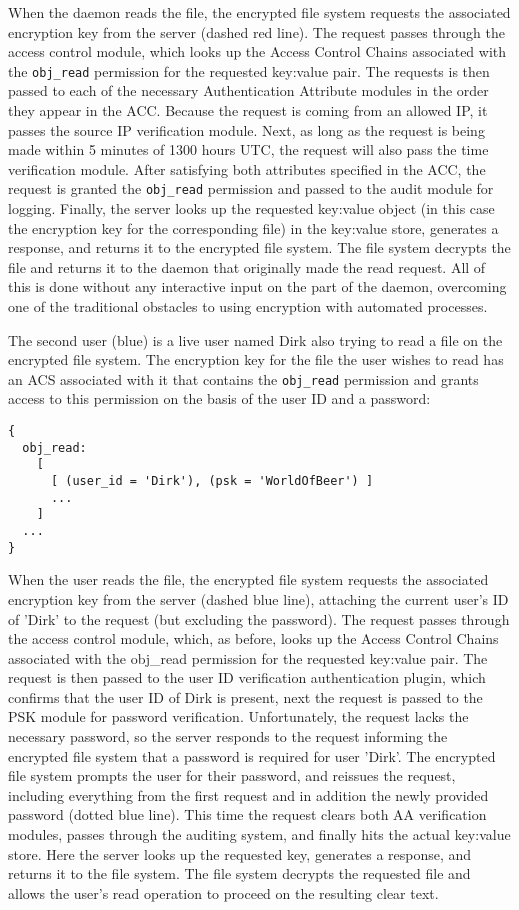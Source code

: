 When the daemon reads the file, the encrypted file system requests the
associated encryption key from the server (dashed red line). The
request passes through the access control module, which looks up the
Access Control Chains associated with the \texttt{obj\_read}
permission for the requested key:value pair. The requests is then
passed to each of the necessary Authentication Attribute modules in
the order they appear in the ACC. Because the request is coming from
an allowed IP, it passes the source IP verification module. Next, as
long as the request is being made within 5 minutes of 1300 hours UTC,
the request will also pass the time verification module. After
satisfying both attributes specified in the ACC, the request is
granted the \texttt{obj\_read} permission and passed to the audit
module for logging. Finally, the server looks up the requested
key:value object (in this case the encryption key for the
corresponding file) in the key:value store, generates a response, and
returns it to the encrypted file system. The file system decrypts the
file and returns it to the daemon that originally made the read
request. All of this is done without any interactive input on the part
of the daemon, overcoming one of the traditional obstacles to using
encryption with automated processes.

The second user (blue) is a live user named Dirk also trying to read a
file on the encrypted file system. The encryption key for the file the
user wishes to read has an ACS associated with it that contains the
\texttt{obj\_read} permission and grants access to this permission on
the basis of the user ID and a password:

\begin{verbatim}
{
  obj_read:
    [
      [ (user_id = 'Dirk'), (psk = 'WorldOfBeer') ]
      ...
    ]
  ...
}
\end{verbatim}

When the user reads the file, the encrypted file system requests the
associated encryption key from the server (dashed blue line),
attaching the current user's ID of 'Dirk' to the request (but
excluding the password). The request passes through the access control
module, which, as before, looks up the Access Control Chains
associated with the obj\_read permission for the requested key:value
pair. The request is then passed to the user ID verification
authentication plugin, which confirms that the user ID of Dirk is
present, next the request is passed to the PSK module for password
verification. Unfortunately, the request lacks the necessary password,
so the server responds to the request informing the encrypted file
system that a password is required for user 'Dirk'. The encrypted file
system prompts the user for their password, and reissues the request,
including everything from the first request and in addition the newly
provided password (dotted blue line). This time the request clears
both AA verification modules, passes through the auditing system, and
finally hits the actual key:value store. Here the server looks up the
requested key, generates a response, and returns it to the file
system. The file system decrypts the requested file and allows the
user's read operation to proceed on the resulting clear text.

